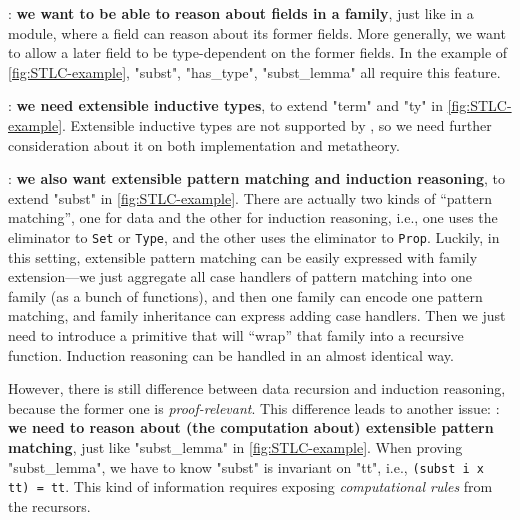:\textbf{ we want to be able to
reason about fields in a family}, just like in a module, where a field
can reason about its former fields. More generally, we want to allow a
later field to be type-dependent on the former fields. In the example of
\cref{fig:STLC-example}, "subst", "has_type", "subst_lemma" all require
this feature.

:\textbf{ we need extensible
inductive types}, to extend "term" and "ty" in \cref{fig:STLC-example}.
Extensible inductive types are not supported by \citet{zm2017}, so
we need further consideration about it on both implementation and
metatheory.

: \textbf{we also want extensible
pattern matching and induction reasoning}, to extend "subst" in
\cref{fig:STLC-example}.
There are actually two kinds of ``pattern matching'', one for data and
the other for induction reasoning, i.e., one uses the eliminator to
\texttt{Set} or \texttt{Type}, and the other uses the
eliminator to \texttt{Prop}. Luckily, in this setting,
extensible pattern matching can be easily expressed with family
extension---we just aggregate all case handlers of pattern matching
into one family (as a bunch of functions), and then one family can
encode one pattern matching, and family inheritance can express adding
case handlers. Then we just need to introduce a primitive that will
``wrap'' that family into a recursive function. Induction reasoning can
be handled in an almost identical way. 

However, there is still difference between data recursion and induction
reasoning, because the former one is \textit{proof-relevant}. This
difference leads to another issue: :
\textbf{we need to reason about (the computation about) extensible
pattern matching}, just like "subst_lemma" in \cref{fig:STLC-example}.
When proving "subst_lemma", we have to know "subst" is invariant on
"tt", i.e., \texttt{(subst i x tt) = tt}. This kind of
information requires exposing \textit{computational rules} from the
recursors.

